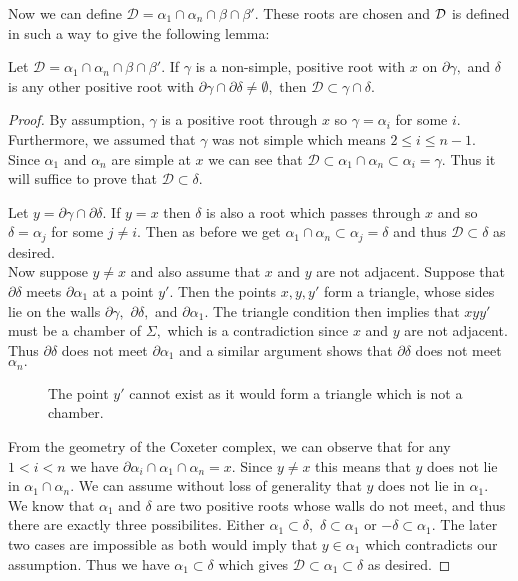 \documentclass[class=book, crop=false,12 pt]{standalone}
\begin{document}
Now we can define $\mathcal{D}=\alpha_1\cap \alpha_n \cap \beta\cap \beta'.$ These roots are chosen and $\mathcal{D}$ is defined in such a way to give the following lemma:

\begin{lemma}
	Let $\mathcal{D}=\alpha_1\cap \alpha_n \cap \beta\cap \beta'.$ If $\gamma$ is a non-simple, positive root with $x$ on $\partial \gamma,$ and $\delta$ is any other positive root with $\partial \gamma \cap \partial \delta \neq \emptyset,$ then $\mathcal{D}\subset \gamma \cap \delta.$ \label{containD}
\end{lemma}
\begin{proof}
	By assumption, $\gamma$ is a positive root through $x$ so $\gamma=\alpha_i$ for some $i.$ Furthermore, we assumed that $\gamma$ was not simple which means $2\le i \le n-1.$ Since $\alpha_1$ and $\alpha_n$ are simple at $x$ we can see that $\mathcal{D}\subset \alpha_1\cap \alpha_n\subset \alpha_i=\gamma.$ Thus it will suffice to prove that $\mathcal{D}\subset \delta.$

	Let $y=\partial\gamma \cap \partial \delta.$ If $y=x$ then $\delta$ is also a root which passes through $x$ and so $\delta=\alpha_j$ for some $j\neq i.$ Then as before we get $\alpha_1\cap \alpha_n\subset \alpha_j=\delta$ and thus $\mathcal{D}\subset \delta$ as desired.\\

Now suppose $y\neq x$ and also assume that $x$ and $y$ are not adjacent. Suppose that $\partial \delta$ meets $\partial \alpha_1$ at a point $y'.$ Then the points $x,y,y'$ form a triangle, whose sides lie on the walls $\partial \gamma,$ $\partial \delta,$ and $\partial \alpha_1.$ The triangle condition then implies that $xyy'$ must be a chamber of $\Sigma,$ which is a contradiction since $x$ and $y$ are not adjacent. Thus $\partial \delta$ does not meet $\partial \alpha_1$ and a similar argument shows that $\partial \delta$ does not meet $\alpha_n.$ 

\begin{figure}
\label{impossibletriangle}
\begin{center}
	\caption{The point $y'$ cannot exist as it would form a triangle which is not a chamber.}
\end{center}
\end{figure}


From the geometry of the Coxeter complex, we can observe that for any $1<i<n$ we have $\partial \alpha_i \cap \alpha_1\cap \alpha_n=x.$ Since $y\neq x$ this means that $y$ does not lie in $\alpha_1\cap \alpha_n.$ We can assume without loss of generality that $y$ does not lie in $\alpha_1.$ We know that $\alpha_1$ and $\delta$ are two positive roots whose walls do not meet, and thus there are exactly three possibilites. Either $\alpha_1\subset \delta,$ $\delta\subset\alpha_1$ or $-\delta\subset \alpha_1.$ The later two cases are impossible as both would imply that $y\in \alpha_1$ which contradicts our assumption. Thus we have $\alpha_1\subset\delta$ which gives $\mathcal{D}\subset\alpha_1\subset \delta$ as desired.


\end{proof}
\end{document}
